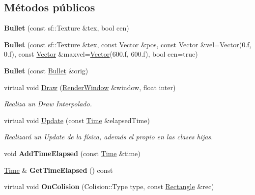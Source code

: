 \subsection*{Métodos públicos}
\begin{DoxyCompactItemize}
\item 
\hypertarget{classBullet_a28f66f8117c5db3ae465ef8722df9464}{{\bfseries Bullet} (const sf\-::\-Texture \&tex, bool cen)}\label{classBullet_a28f66f8117c5db3ae465ef8722df9464}

\item 
\hypertarget{classBullet_a66d17e68781cf0b136b4866f7591dc5a}{{\bfseries Bullet} (const sf\-::\-Texture \&tex, const \hyperlink{classVector}{Vector} \&pos, const \hyperlink{classVector}{Vector} \&vel=\hyperlink{classVector}{Vector}(0.f, 0.f), const \hyperlink{classVector}{Vector} \&maxvel=\hyperlink{classVector}{Vector}(600.f, 600.f), bool cen=true)}\label{classBullet_a66d17e68781cf0b136b4866f7591dc5a}

\item 
\hypertarget{classBullet_a22e572e4d102f86b68db3bfed3532b6d}{{\bfseries Bullet} (const \hyperlink{classBullet}{Bullet} \&orig)}\label{classBullet_a22e572e4d102f86b68db3bfed3532b6d}

\item 
virtual void \hyperlink{classBullet_af27d3a1699386dcd15bcb4a338b8b993}{Draw} (\hyperlink{classRenderWindow}{Render\-Window} \&window, float inter)
\begin{DoxyCompactList}\small\item\em Realiza un Draw Interpolado. \end{DoxyCompactList}\item 
\hypertarget{classBullet_a452c100efdd14343cb7e651477a4f7b5}{virtual void \hyperlink{classBullet_a452c100efdd14343cb7e651477a4f7b5}{Update} (const \hyperlink{classTime}{Time} \&elapsed\-Time)}\label{classBullet_a452c100efdd14343cb7e651477a4f7b5}

\begin{DoxyCompactList}\small\item\em Realizará un Update de la física, además el propio en las clases hijas. \end{DoxyCompactList}\item 
\hypertarget{classBullet_aff602c0a337b7a4290eb1dc0de729463}{void {\bfseries Add\-Time\-Elapsed} (const \hyperlink{classTime}{Time} \&time)}\label{classBullet_aff602c0a337b7a4290eb1dc0de729463}

\item 
\hypertarget{classBullet_ad68e706617b9e3f260329e767fd4cdb6}{\hyperlink{classTime}{Time} \& {\bfseries Get\-Time\-Elapsed} () const }\label{classBullet_ad68e706617b9e3f260329e767fd4cdb6}

\item 
\hypertarget{classBullet_aa1e5f892a1a175f04bc67e2fc993a619}{virtual void {\bfseries On\-Colision} (Colision\-::\-Type type, const \hyperlink{classRectangle}{Rectangle} \&rec)}\label{classBullet_aa1e5f892a1a175f04bc67e2fc993a619}

\end{DoxyCompactItemize}
